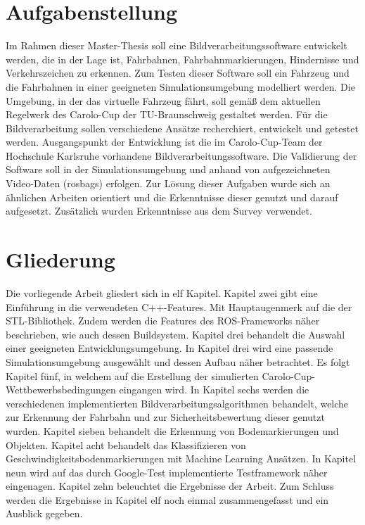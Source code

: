 \section{Aufgabenstellung}
\label{sec:Aufgabenstellung}
Im Rahmen dieser Master-Thesis soll eine Bildverarbeitungssoftware entwickelt werden, die in der Lage
ist, Fahrbahnen, Fahrbahnmarkierungen, Hindernisse und Verkehrszeichen zu erkennen. Zum Testen
dieser Software soll ein Fahrzeug und die Fahrbahnen in einer geeigneten Simulationsumgebung
modelliert werden. Die Umgebung, in der das virtuelle Fahrzeug f\"ahrt, soll gem\"a{\ss} dem aktuellen
Regelwerk des Carolo-Cup der TU-Braunschweig gestaltet werden. F\"ur die Bildverarbeitung sollen
verschiedene Ans\"atze recherchiert, entwickelt und getestet werden. Ausgangspunkt der Entwicklung ist
die im Carolo-Cup-Team der Hochschule Karlsruhe vorhandene Bildverarbeitungssoftware.
Die Validierung der Software soll in der Simulationsumgebung und anhand von aufgezeichneten Video-Daten (rosbags) erfolgen.
Zur L\"osung dieser Aufgaben wurde sich an \"ahnlichen Arbeiten \cite{drauschke,kuhnt} orientiert und die Erkenntnisse dieser genutzt und darauf aufgesetzt. Zus\"atzlich wurden Erkenntnisse aus dem Survey \cite{survey} verwendet.

\section{Gliederung}
\label{sec:Gliederung}

Die vorliegende Arbeit gliedert sich in elf Kapitel. Kapitel zwei gibt eine Einf\"uhrung in die verwendeten C++-Features. Mit Hauptaugenmerk auf die der STL-Bibliothek. Zudem werden die Features des ROS-Frameworks n\"aher beschrieben, wie auch dessen Buildsystem.
Kapitel drei behandelt die Auswahl einer geeigneten Entwicklungsumgebung. In Kapitel drei wird eine passende Simulationsumgebung ausgew\"ahlt und dessen Aufbau n\"aher betrachtet.
Es folgt Kapitel f\"unf, in welchem auf die Erstellung der simulierten Carolo-Cup-Wettbewerbsbedingungen eingangen wird.
In Kapitel sechs werden die verschiedenen implementierten Bildverarbeitungsalgorithmen behandelt, welche zur Erkennung der Fahrbahn und zur Sicherheitsbewertung dieser genutzt wurden.
Kapitel sieben behandelt die Erkennung von Bodemarkierungen und Objekten. Kapitel acht behandelt das Klassifizieren von Geschwindigkeitsbodenmarkierungen mit Machine Learning Ans\"atzen.
In Kapitel neun wird auf das durch Google-Test implementierte Testframework n\"aher eingenagen. Kapitel zehn beleuchtet die Ergebnisse der Arbeit.
Zum Schluss werden die Ergebnisse in Kapitel elf noch einmal zusammengefasst und ein Ausblick gegeben.



